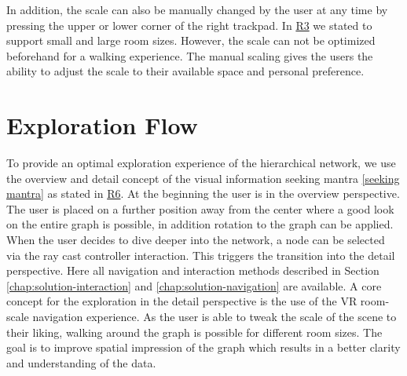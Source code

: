 In addition, the scale can also be manually changed by the user at any time by pressing the upper or lower corner of the right trackpad. 
In \hyperref[req:R3]{R3} we stated to support small and large room sizes.  However, the scale can not be optimized beforehand for a walking experience. The manual scaling gives the users the ability to adjust the scale to their available space and personal preference.
\section{Exploration Flow}
\label{chap:ps-explorationFlow}
To provide an optimal exploration experience of the hierarchical network, we use the overview and detail concept of the visual information seeking mantra \ref{seeking mantra} as stated in \hyperref[req:R6]{R6}. 
At the beginning the user is in the overview perspective. The user is placed on a further position away from the center where a good look on the entire graph is possible, in addition rotation to the graph can be applied.
When the user decides to dive deeper into the network, a node can be selected via the ray cast controller interaction. This triggers the transition into the detail perspective. 
Here all navigation and interaction methods described in Section \ref{chap:solution-interaction} and \ref{chap:solution-navigation}
are available. 
A core concept for the exploration in the detail perspective is the use of the VR room-scale navigation experience. As the user is able to tweak the scale of the scene to their liking, walking around the graph is possible for different room sizes. The goal is to improve spatial impression of the graph which results in a better clarity and understanding of the data.


